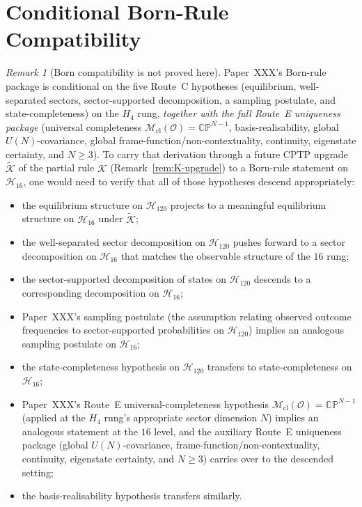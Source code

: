 \documentclass[12pt]{article}
\theoremstyle{definition}
\theoremstyle{remark}
\newtheorem{remark}[theorem]{Remark}
\newcommand{\Hcal}{\mathcal{H}}
\newcommand{\Kcal}{\mathcal{K}}
\newcommand{\Mcl}{\mathcal{M}_{\mathrm{cl}}}
\newcommand{\Ocal}{\mathcal{O}}
\begin{document}
\section{Conditional Born-Rule Compatibility}\label{sec:born}

\begin{remark}[Born compatibility is not proved here]\label{rem:born-conditional}
Paper~XXX's Born-rule package is conditional on the five Route~C hypotheses (equilibrium, well-separated sectors, sector-supported decomposition, a sampling postulate, and state-completeness) on the $H_4$ rung, \emph{together with the full Route~E uniqueness package} (universal completeness $\Mcl(\Ocal) = \mathbb{CP}^{N-1}$, basis-realisability, global $U(N)$-covariance, global frame-function/non-contextuality, continuity, eigenstate certainty, and $N\ge 3$). To carry that derivation through a future CPTP upgrade $\widetilde{\Kcal}$ of the partial rule $\Kcal$ (Remark~\ref{rem:K-upgrade}) to a Born-rule statement on $\Hcal_{16}$, one would need to verify that all of those hypotheses descend appropriately:

\begin{itemize}
\item the equilibrium structure on $\Hcal_{120}$ projects to a meaningful equilibrium structure on $\Hcal_{16}$ under $\widetilde{\Kcal}$;
\item the well-separated sector decomposition on $\Hcal_{120}$ pushes forward to a sector decomposition on $\Hcal_{16}$ that matches the observable structure of the $16$ rung;
\item the sector-supported decomposition of states on $\Hcal_{120}$ descends to a corresponding decomposition on $\Hcal_{16}$;
\item Paper~XXX's sampling postulate (the assumption relating observed outcome frequencies to sector-supported probabilities on $\Hcal_{120}$) implies an analogous sampling postulate on $\Hcal_{16}$;
\item the state-completeness hypothesis on $\Hcal_{120}$ transfers to state-completeness on $\Hcal_{16}$;
\item Paper~XXX's Route~E universal-completeness hypothesis $\Mcl(\Ocal) = \mathbb{CP}^{N-1}$ (applied at the $H_4$ rung's appropriate sector dimension $N$) implies an analogous statement at the $16$ level, and the auxiliary Route~E uniqueness package (global $U(N)$-covariance, frame-function/non-contextuality, continuity, eigenstate certainty, and $N\ge 3$) carries over to the descended setting;
\item the basis-realisability hypothesis transfers similarly.
\end{itemize}


\end{remark}
\end{document}
